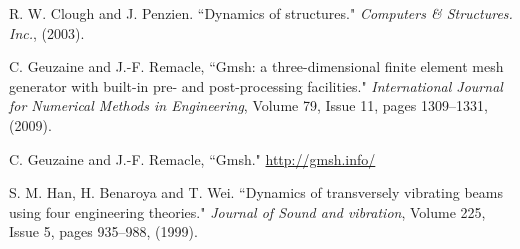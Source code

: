 \documentclass[a4]{article}
\begin{document}
\begin{thebibliography}{99}
	
	 R. W. Clough and J. Penzien. ``Dynamics of structures." \textit{Computers \& Structures. Inc.}, (2003).
	
	 C. Geuzaine and J.-F. Remacle, ``Gmsh: a three-dimensional finite element mesh generator with built-in pre- and post-processing facilities." \textit{International Journal for Numerical Methods in Engineering}, Volume 79, Issue 11, pages 1309--1331, (2009).
	
	  C. Geuzaine and J.-F. Remacle, ``Gmsh." \url{http://gmsh.info/}
	
	 S. M. Han, H. Benaroya and T. Wei. ``Dynamics of transversely vibrating beams using four engineering theories." \textit{Journal of Sound and vibration}, Volume 225, Issue 5, pages 935--988, (1999).
	
\end{thebibliography}
\end{document}

